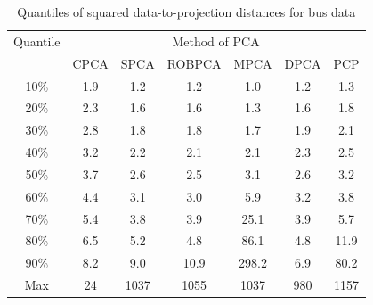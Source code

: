 
\begin{table}[t]
\centering
    \begin{tabular}{c|cccccc}
    \hline
    Quantile & \multicolumn{6}{c}{Method of PCA}         \\ \cline{2-7}
    ~                   & CPCA     & SPCA & ROBPCA & MPCA & DPCA & PCP\\\hline 
    10\%      & 1.9       & 1.2       & 1.2    & 1.0       & 1.2       & 1.3\\
    20\%      & 2.3       & 1.6       & 1.6    & 1.3       & 1.6       & 1.8\\
    30\%      & 2.8       & 1.8       & 1.8    & 1.7       & 1.9       & 2.1\\
    40\%      & 3.2       & 2.2       & 2.1    & 2.1       & 2.3       & 2.5\\
    50\%      & 3.7       & 2.6       & 2.5    & 3.1       & 2.6       & 3.2\\
    60\%      & 4.4       & 3.1       & 3.0    & 5.9       & 3.2       & 3.8\\
    70\%      & 5.4       & 3.8       & 3.9    & 25.1      & 3.9       & 5.7\\
    80\%      & 6.5       & 5.2       & 4.8    & 86.1      & 4.8       & 11.9\\
    90\%      & 8.2       & 9.0       & 10.9   & 298.2     & 6.9      & 80.2\\
    Max       & 24        & 1037      & 1055   & 1037      & 980      & 1157\\\hline
    \end{tabular}
    \caption{Quantiles of squared data-to-projection distances for bus data}
    \label{table:bus_table2}
\end{table}

